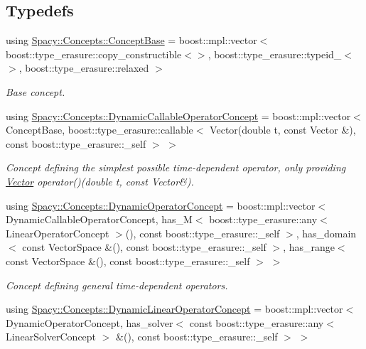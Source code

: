 \subsection*{Typedefs}
\begin{DoxyCompactItemize}
\item 
using \hyperlink{group__ConceptGroup_ga63426675cc05ccce03ead56a4fa90d96_ga63426675cc05ccce03ead56a4fa90d96}{Spacy\+::\+Concepts\+::\+Concept\+Base} = boost\+::mpl\+::vector$<$ boost\+::type\+\_\+erasure\+::copy\+\_\+constructible$<$$>$, boost\+::type\+\_\+erasure\+::typeid\+\_\+$<$$>$, boost\+::type\+\_\+erasure\+::relaxed $>$
\begin{DoxyCompactList}\small\item\em Base concept. \end{DoxyCompactList}\item 
using \hyperlink{group__ConceptGroup_ga30692db093ead5a1a074905363a2f043_ga30692db093ead5a1a074905363a2f043}{Spacy\+::\+Concepts\+::\+Dynamic\+Callable\+Operator\+Concept} = boost\+::mpl\+::vector$<$ Concept\+Base, boost\+::type\+\_\+erasure\+::callable$<$ Vector(double t, const Vector \&), const boost\+::type\+\_\+erasure\+::\+\_\+self $>$ $>$
\begin{DoxyCompactList}\small\item\em Concept defining the simplest possible time-\/dependent operator, only providing \hyperlink{classSpacy_1_1Vector}{Vector} operator()(double t, const Vector\&). \end{DoxyCompactList}\item 
using \hyperlink{group__ConceptGroup_ga2c979d268f0ca7a436776a9631d10af7_ga2c979d268f0ca7a436776a9631d10af7}{Spacy\+::\+Concepts\+::\+Dynamic\+Operator\+Concept} = boost\+::mpl\+::vector$<$ Dynamic\+Callable\+Operator\+Concept, has\+\_\+\+M$<$ boost\+::type\+\_\+erasure\+::any$<$ Linear\+Operator\+Concept $>$(), const boost\+::type\+\_\+erasure\+::\+\_\+self $>$, has\+\_\+domain$<$ const Vector\+Space \&(), const boost\+::type\+\_\+erasure\+::\+\_\+self $>$, has\+\_\+range$<$ const Vector\+Space \&(), const boost\+::type\+\_\+erasure\+::\+\_\+self $>$ $>$
\begin{DoxyCompactList}\small\item\em Concept defining general time-\/dependent operators. \end{DoxyCompactList}\item 
using \hyperlink{group__ConceptGroup_ga015b0d099011a2ef73a16aa9b36a7346_ga015b0d099011a2ef73a16aa9b36a7346}{Spacy\+::\+Concepts\+::\+Dynamic\+Linear\+Operator\+Concept} = boost\+::mpl\+::vector$<$ Dynamic\+Operator\+Concept, has\+\_\+solver$<$ const boost\+::type\+\_\+erasure\+::any$<$ Linear\+Solver\+Concept $>$ \&(), const boost\+::type\+\_\+erasure\+::\+\_\+self $>$ $>$

\end{DoxyCompactItemize}
